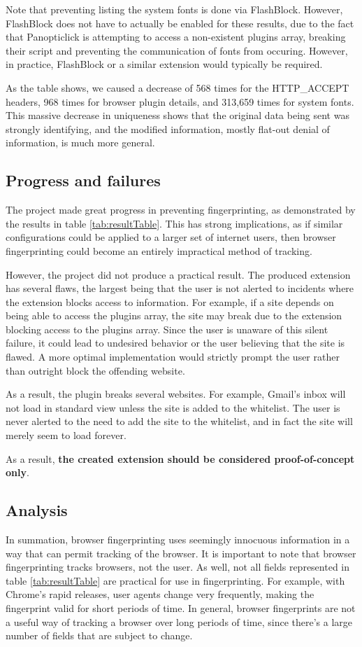 \documentclass[12pt,a4paper]{article}
\begin{document}
Note that preventing listing the system fonts is done via FlashBlock. However, FlashBlock does not have to actually be enabled for these results, due to the fact that Panopticlick is attempting to access a non-existent plugins array, breaking their script and preventing the communication of fonts from occuring. However, in practice, FlashBlock or a similar extension would typically be required.

As the table shows, we caused a decrease of 568 times for the HTTP\_ACCEPT headers, 968 times for browser plugin details, and 313,659 times for system fonts. This massive decrease in uniqueness shows that the original data being sent was strongly identifying, and the modified information, mostly flat-out denial of information, is much more general.

\subsection{Progress and failures}
The project made great progress in preventing fingerprinting, as demonstrated by the results in table \ref{tab:resultTable}. This has strong implications, as if similar configurations could be applied to a larger set of internet users, then browser fingerprinting could become an entirely impractical method of tracking.

However, the project did not produce a practical result. The produced extension has several flaws, the largest being that the user is not alerted to incidents where the extension blocks access to information. For example, if a site depends on being able to access the plugins array, the site may break due to the extension blocking access to the plugins array. Since the user is unaware of this silent failure, it could lead to undesired behavior or the user believing that the site is flawed. A more optimal implementation would strictly prompt the user rather than outright block the offending website.

As a result, the plugin breaks several websites. For example, Gmail's inbox will not load in standard view unless the site is added to the whitelist. The user is never alerted to the need to add the site to the whitelist, and in fact the site will merely seem to load forever.

As a result, \textbf{the created extension should be considered proof-of-concept only}.

\subsection{Analysis}
In summation, browser fingerprinting uses seemingly innocuous information in a way that can permit tracking of the browser. It is important to note that browser fingerprinting tracks browsers, not the user. As well, not all fields represented in table \ref{tab:resultTable} are practical for use in fingerprinting. For example, with Chrome's rapid releases, user agents change very frequently, making the fingerprint valid for short periods of time. In general, browser fingerprints are not a useful way of tracking a browser over long periods of time, since there's a large number of fields that are subject to change.
\end{document}
